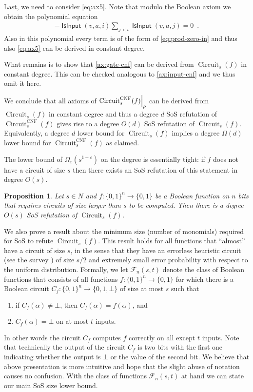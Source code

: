 \documentclass[10pt,a4paper]{article}
\theoremstyle{plain}
\newtheorem{proposition}[theorem]{Proposition}
\theoremstyle{remark}
\theoremstyle{definition}
\newcommand{\eps}{\varepsilon}
\newcommand{\eqperiod}{\enspace .}
\newcommand{\set}[1]{\{#1\}}
\newcommand\restrict[2]{{%
  \left.\kern-\nulldelimiterspace %
  #1 %
  \vphantom{\big|} %
  \right|_{#2} %
  }}
\newcommand{\calF}{\mathcal{F}}
\newcommand{\vars}[1]{\mathsf{#1}}
\DeclareMathOperator{\circuit}{Circuit}
\DeclareMathOperator{\isvar}{\vars{IsInput}}
\begin{document}
Last, we need to consider \cref{eq:ax5}. Note that modulo the Boolean
axiom we obtain the polynomial equation
\begin{align}
  - \isvar(v,a,i)\sum_{j < i}\isvar(v,a,j) = 0 \eqperiod
\end{align}
Also in this polynomial every term is of the form of
\cref{eq:prod-zero-in} and thus also \cref{eq:ax5} can be derived in
constant degree.

What remains is to show that \cref{ax:gate-cnf} can be derived from
$\circuit_s(f)$ in constant degree. This can be checked analogous to
\cref{ax:input-cnf} and we thus omit it here.

We conclude that all axioms of $\restrict{\circuit^{\mathrm{CNF}}_s(f)}{\rho}$ can
be derived from $\circuit_s(f)$ in constant degree and thus a degree
$d$ SoS refutation of $\circuit_s^{\mathrm{CNF}}(f)$ gives rise to a degree
$O(d)$ SoS refutation of $\circuit_s(f)$. Equivalently, a degree $d$
lower bound for $\circuit_s(f)$ implies a degree $\Omega(d)$ lower
bound for $\circuit_s^{\mathrm{CNF}}(f)$ as claimed.

The lower bound of $\Omega_\eps(s^{1-\eps})$ on the degree is
essentially tight: if $f$ does not have a circuit of size $s$ then
there exists an SoS refutation of this statement in degree $O(s)$.

\begin{proposition}
  Let $s \in N$ and $f: \set{0,1}^n \rightarrow \set{0,1}$ be a
  Boolean function on $n$ bits that requires circuits of size larger
  than $s$ to be computed. Then there is a degree $O(s)$ SoS
  refutation of $\circuit_s(f)$.
\end{proposition}

We also prove a result about the minimum size (number of monomials)
required for SoS to refute $\circuit_s(f)$. This result holds for all
functions that ``almost'' have a circuit of size $s$, in the sense that
they have an errorless heuristic circuit (see the survey \cite{BT06})
of size $s/2$ and extremely small error probability
with respect to the uniform distribution.
% 
Formally, we let $\calF_n(s,t)$ denote the class of Boolean functions
that consists of all functions $f: \set{0,1}^n \rightarrow \set{0,1}$
for which there is a Boolean circuit
$C_f: \set{0,1}^n \rightarrow \set{0, 1, \bot}$ of size at most $s$
such that
\begin{enumerate}
\item if $C_f(\alpha) \neq \bot$, then $C_f(\alpha) = f(\alpha)$, and
\item $C_f(\alpha) = \bot$ on at most $t$ inputs.
\end{enumerate}
In other words the circuit $C_f$ computes $f$ correctly on all except
$t$ inputs. Note that technically the output of the circuit $C_f$ is
two bits with the first one indicating whether the output is $\bot$ or
the value of the second bit.  We believe that above presentation is
more intuitive and hope that the slight abuse of notation causes no
confusion. With the class of functions $\calF_n(s,t)$ at hand we can
state our main SoS size lower bound.
\end{document}
